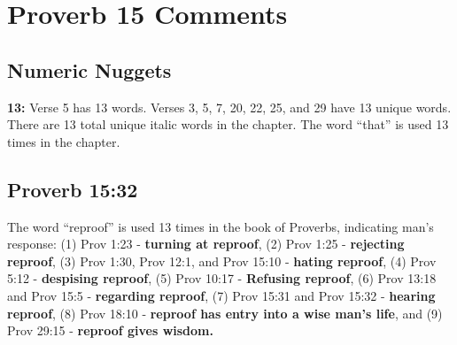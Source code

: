 \section{Proverb 15 Comments}

\subsection{Numeric Nuggets}
\textbf{13:} Verse 5 has 13 words. Verses 3, 5, 7, 20, 22, 25, and 29 have 13 unique words. There  are 13 total unique italic words in the chapter. The word ``that'' is used 13 times in the chapter. 

\subsection{Proverb 15:32}
The word ``reproof'' is used 13 times in the book of Proverbs, indicating man's response: (1) Prov 1:23 - \textbf{turning at reproof}, (2) Prov 1:25 - \textbf{rejecting reproof}, (3) Prov 1:30, Prov 12:1, and Prov 15:10 - \textbf{hating reproof}, (4) Prov 5:12 - \textbf{despising reproof}, (5) Prov 10:17 - \textbf{Refusing reproof}, (6) Prov 13:18 and Prov 15:5 - \textbf{regarding reproof}, (7) Prov 15:31 and Prov 15:32 - \textbf{hearing reproof}, (8) Prov 18:10 - \textbf{reproof has entry into a wise man's life}, and (9) Prov 29:15 - \textbf{reproof gives wisdom.}